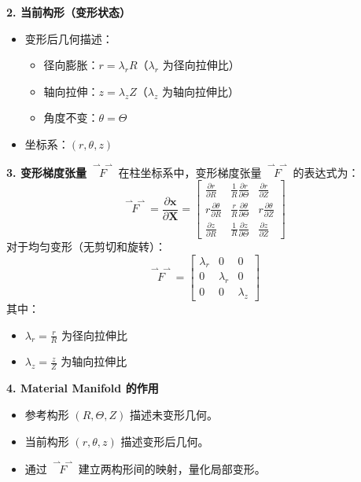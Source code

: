 \documentclass[12pt, a4paper, oneside, UTF8]{ctexbook}  %
\newcommand{\vvec}{\overset{\rightharpoonup\!\!\!\! \rightharpoonup}}
\begin{document}
\begin{add}
\begin{example}
\textbf{2. 当前构形（变形状态）}
\begin{itemize}
  \item 变形后几何描述：
    \begin{itemize}
      \item 径向膨胀：\( r = \lambda_r R \)（\(\lambda_r\) 为径向拉伸比）
      \item 轴向拉伸：\( z = \lambda_z Z \)（\(\lambda_z\) 为轴向拉伸比）
      \item 角度不变：\( \theta = \Theta \)
    \end{itemize}
  \item 坐标系：\( (r, \theta, z) \)
\end{itemize}

\textbf{3. 变形梯度张量 \(\vvec{F}\)}
在柱坐标系中，变形梯度张量 \(\vvec{F}\) 的表达式为：
\[
\vvec{F} = \frac{\partial \mathbf{x}}{\partial \mathbf{X}} = 
\begin{bmatrix}
  \frac{\partial r}{\partial R}       & \frac{1}{R}\frac{\partial r}{\partial \Theta} & \frac{\partial r}{\partial Z} \\
  r\frac{\partial \theta}{\partial R} & \frac{r}{R}\frac{\partial \theta}{\partial \Theta} & r\frac{\partial \theta}{\partial Z} \\
  \frac{\partial z}{\partial R}       & \frac{1}{R}\frac{\partial z}{\partial \Theta} & \frac{\partial z}{\partial Z}
\end{bmatrix}
\]
对于均匀变形（无剪切和旋转）：
\[
\vvec{F} = 
\begin{bmatrix}
  \lambda_r & 0         & 0 \\
  0         & \lambda_r & 0 \\
  0         & 0         & \lambda_z
\end{bmatrix}
\]
其中：
\begin{itemize}
  \item \(\lambda_r = \frac{r}{R}\) 为径向拉伸比
  \item \(\lambda_z = \frac{z}{Z}\) 为轴向拉伸比
\end{itemize}

\textbf{4. Material Manifold 的作用}
\begin{itemize}
  \item 参考构形 \((R, \Theta, Z)\) 描述未变形几何。
  \item 当前构形 \((r, \theta, z)\) 描述变形后几何。
  \item 通过 \(\vvec{F}\) 建立两构形间的映射，量化局部变形。
\end{itemize}


\end{example}
\end{add}
\end{document}
